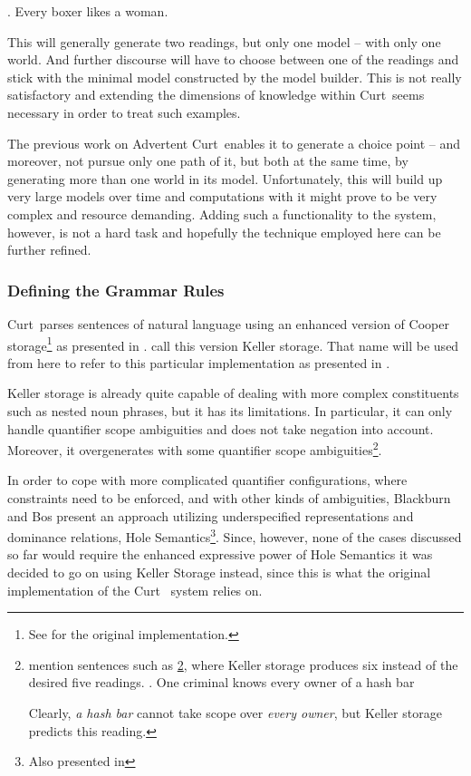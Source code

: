 \documentclass[12pt,a4paper]{article}
\newcommand{\term}{\textsf} %
\newcommand{\pn}{\textsf} %
\newcommand{\example}{\textit} %
\newcommand{\curt}{\pn{Curt}\mbox{ }}
\newcommand{\acurt}{\pn{Advertent Curt}\mbox{ }}
\theoremstyle{remark} \newtheorem*{termin}{Definition} %
\begin{document}
\ex.\label{ex:ambig} Every boxer likes a woman.

This will generally generate two readings, but only one model -- with only one
world. And further discourse will have to choose between one of the readings and
stick with the minimal model constructed by the model builder. This is not
really satisfactory and extending the dimensions of knowledge within \curt seems
necessary in order to treat such examples.

The previous work on \acurt enables it to generate a \term{choice point} -- and
moreover, not pursue only one path of it, but both at the same time, by
generating more than one world in its model.
Unfortunately, this will build up very large models over time and computations
with it might prove to be very complex and resource demanding. Adding such a
functionality to the system, however, is not a hard task and hopefully the
technique employed here can be further refined. %

\subsubsection{Defining the Grammar Rules}

\curt parses sentences of natural language using an enhanced version of \pn{Cooper
storage}\footnote{See \cite{cooper:storage2} for the original implementation.} as
presented in \cite{keller:storage}. \cite{blackburnbos:cl1} call this version
\pn{Keller storage}. That name will be used from here %
to refer to this particular implementation as presented in
\cite{blackburnbos:cl1}. 

\pn{Keller storage} is already quite capable
of dealing with more complex constituents such as nested noun phrases, but it
has its limitations. In particular, it can only handle quantifier scope
ambiguities and does not take negation into account. Moreover, it overgenerates
with some quantifier scope ambiguities\footnote{\cite{blackburnbos:cl1} mention
sentences such as \ref{ex:kellersucks}, where Keller storage produces six
instead of the desired five readings.
\ex. One criminal knows every owner of a hash bar\label{ex:kellersucks}

Clearly, \example{a hash bar} cannot take scope over \example{every owner}, but
Keller storage predicts this reading.}.

In order to cope with more complicated quantifier configurations, where
constraints need to be enforced, and with other kinds of ambiguities,
Blackburn and Bos present an approach utilizing underspecified representations and
dominance relations, \pn{Hole Semantics}\footnote{Also presented in %
}. Since, however, none of the cases discussed so far would require the enhanced
expressive power of \pn{Hole Semantics} it was decided to go on using \pn{Keller
Storage} instead, since this is what the original implementation of the \curt
system relies on.
\end{document}
